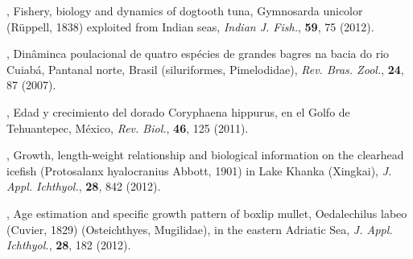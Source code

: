 \begin{thebibliography}{100}
, {Fishery, biology and dynamics of dogtooth tuna, Gymnosarda unicolor (Rüppell, 1838) exploited from Indian seas}, \textit{Indian J. Fish.}, \textbf{59}, {75} {(2012)}.




, {Din\^{a}minca poulacional de quatro esp\'{e}cies de grandes bagres na bacia do rio Cuiab\'{a}, Pantanal norte, Brasil (siluriformes, Pimelodidae)}, \textit{ Rev. Bras. Zool.}, \textbf{24}, 87 {(2007)}.
%

, {Edad y crecimiento del dorado Coryphaena hippurus, en el Golfo de Tehuantepec, México}, \textit{Rev. Biol.}, \textbf{46}, 125 {(2011)}.
%

, {Growth, length-weight relationship and biological information on the clearhead icefish (Protosalanx hyalocranius Abbott, 1901) in Lake Khanka (Xingkai)}, \textit{J. Appl. Ichthyol.}, \textbf{28}, 842 {(2012)}.
%

, {Age estimation and specific growth pattern of boxlip mullet, Oedalechilus labeo (Cuvier, 1829) (Osteichthyes, Mugilidae), in the eastern Adriatic Sea}, \textit{J. Appl. Ichthyol.}, \textbf{28}, 182 (2012).
%


\end{thebibliography}
